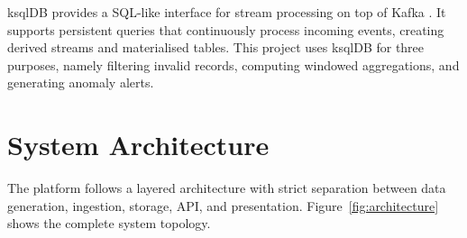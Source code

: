 \documentclass[12pt,a4paper]{article}
\begin{document}
ksqlDB provides a SQL-like interface for stream processing on top of Kafka \cite{ksqldocs}. It supports persistent queries that continuously process incoming events, creating derived streams and materialised tables. This project uses ksqlDB for three purposes, namely filtering invalid records, computing windowed aggregations, and generating anomaly alerts.


\section{System Architecture}
\label{sec:architecture}

The platform follows a layered architecture with strict separation between data generation, ingestion, storage, API, and presentation. Figure~\ref{fig:architecture} shows the complete system topology.
\end{document}
